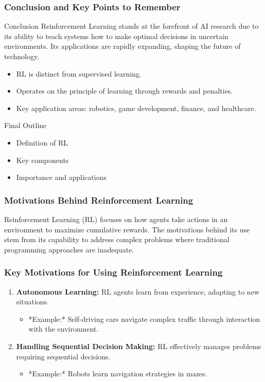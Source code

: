 \documentclass[aspectratio=169]{beamer}
\begin{document}
\begin{frame}[fragile]
    \frametitle{Conclusion and Key Points to Remember}
    
    \begin{block}{Conclusion}
        Reinforcement Learning stands at the forefront of AI research due to its ability to teach systems how to make optimal decisions in uncertain environments. Its applications are rapidly expanding, shaping the future of technology.
    \end{block}
    
    \begin{itemize}
        \item RL is distinct from supervised learning.
        \item Operates on the principle of learning through rewards and penalties.
        \item Key application areas: robotics, game development, finance, and healthcare.
    \end{itemize}
    
    \begin{block}{Final Outline}
        \begin{itemize}
            \item Definition of RL
            \item Key components
            \item Importance and applications
        \end{itemize}
    \end{block}
\end{frame}

\begin{frame}[fragile]
    \frametitle{Motivations Behind Reinforcement Learning}
    Reinforcement Learning (RL) focuses on how agents take actions in an environment to maximize cumulative rewards. The motivations behind its use stem from its capability to address complex problems where traditional programming approaches are inadequate.
\end{frame}

\begin{frame}[fragile]
    \frametitle{Key Motivations for Using Reinforcement Learning}
    \begin{enumerate}
        \item \textbf{Autonomous Learning:} 
        RL agents learn from experience, adapting to new situations.
        \begin{itemize}
            \item *Example:* Self-driving cars navigate complex traffic through interaction with the environment.
        \end{itemize}

        \item \textbf{Handling Sequential Decision Making:} 
        RL effectively manages problems requiring sequential decisions.
        \begin{itemize}
            \item *Example:* Robots learn navigation strategies in mazes.
        \end{itemize}
    \end{enumerate}
\end{frame}
\end{document}
